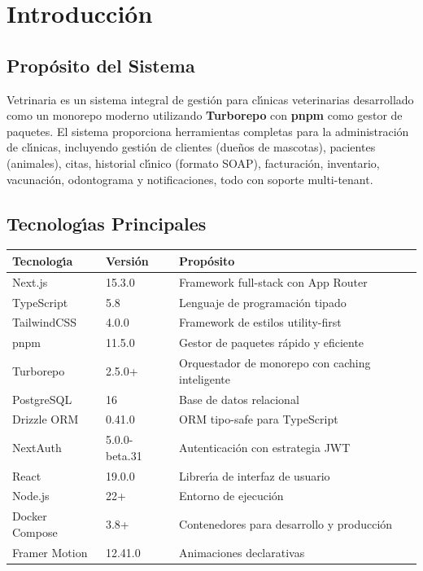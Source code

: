 \chapter{Introducci\'on}

\section{Prop\'osito del Sistema}

Vetrinaria es un sistema integral de gesti\'on para cl\'{\i}nicas veterinarias
desarrollado como un monorepo moderno utilizando \textbf{Turborepo} con
\textbf{pnpm} como gestor de paquetes. El sistema proporciona herramientas
completas para la administraci\'on de cl\'{\i}nicas, incluyendo gesti\'on de
clientes (due\~nos de mascotas), pacientes (animales), citas, historial
cl\'{\i}nico (formato SOAP), facturaci\'on, inventario, vacunaci\'on,
odontograma y notificaciones, todo con soporte multi-tenant.

\section{Tecnolog\'{\i}as Principales}

\begin{longtable}{|l|l|p{8cm}|}
\hline
\textbf{Tecnolog\'{\i}a} & \textbf{Versi\'on} & \textbf{Prop\'osito} \\
\hline
\endhead
Next.js & 15.3.0 & Framework full-stack con App Router \\
TypeScript & 5.8 & Lenguaje de programaci\'on tipado \\
TailwindCSS & 4.0.0 & Framework de estilos utility-first \\
pnpm & 11.5.0 & Gestor de paquetes r\'apido y eficiente \\
Turborepo & 2.5.0+ & Orquestador de monorepo con caching inteligente \\
PostgreSQL & 16 & Base de datos relacional \\
Drizzle ORM & 0.41.0 & ORM tipo-safe para TypeScript \\
NextAuth & 5.0.0-beta.31 & Autenticaci\'on con estrategia JWT \\
React & 19.0.0 & Librer\'{\i}a de interfaz de usuario \\
Node.js & 22+ & Entorno de ejecuci\'on \\
Docker Compose & 3.8+ & Contenedores para desarrollo y producci\'on \\
Framer Motion & 12.41.0 & Animaciones declarativas \\
\hline
\end{longtable}

